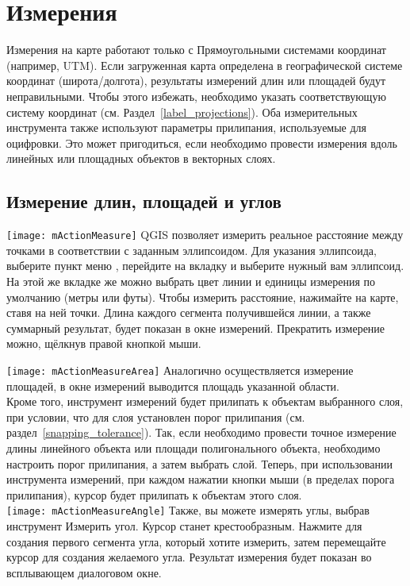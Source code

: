 \section{Измерения}\label{sec:measure}

Измерения на карте работают только с Прямоугольными системами координат
(например, UTM). Если загруженная карта определена в географической
системе координат (широта/долгота), результаты измерений длин или площадей
будут неправильными. Чтобы этого избежать, необходимо указать
соответствующую систему координат (см. Раздел~\ref{label_projections}).
Оба измерительных инструмента также используют параметры прилипания, используемые
для оцифровки. Это может пригодиться, если необходимо провести измерения вдоль
линейных или площадных объектов в векторных слоях.

\subsection{Измерение длин, площадей и углов}

\texttt{[image: mActionMeasure]}
QGIS позволяет измерить реальное расстояние между точками в
соответствии с заданным эллипсоидом. Для указания эллипсоида, выберите пункт
меню  \arrow {}, перейдите на вкладку
 и выберите нужный вам эллипсоид. На этой же вкладке же
можно выбрать цвет линии и единицы измерения по умолчанию (метры или футы).
Чтобы измерить расстояние, нажимайте на карте, ставя на ней точки. Длина
каждого сегмента получившейся линии, а также суммарный результат, будет
показан в окне измерений. Прекратить измерение можно, щёлкнув правой кнопкой мыши.

\texttt{[image: mActionMeasureArea]} Аналогично осуществляется измерение
площадей, в окне измерений выводится площадь указанной области.\\
Кроме того, инструмент измерений будет прилипать к объектам выбранного слоя,
при условии, что для слоя установлен порог прилипания
(см. раздел~\ref{snapping_tolerance}). Так, если необходимо провести точное
измерение длины линейного объекта или площади полигонального объекта, необходимо
настроить порог прилипания, а затем выбрать слой. Теперь, при использовании
инструмента измерений, при каждом нажатии кнопки мыши (в пределах порога
прилипания), курсор будет прилипать к объектам этого слоя. \\
\texttt{[image: mActionMeasureAngle]}
Также, вы можете измерять углы, выбрав инструмент Измерить угол. Курсор
станет крестообразным. Нажмите для создания первого сегмента угла, который
хотите измерить, затем перемещайте курсор для создания желаемого угла.
Результат измерения будет показан во всплывающем диалоговом окне.

